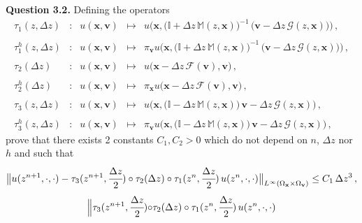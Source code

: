 \documentclass[10pt]{article}
\begin{document}
\begin{leftbar}
\textbf{Question 3.2.} Defining the operators
\begin{equation}
\begin{array}{rcccl}
\tau_{1}(z,\Delta z) & : & u(\mathbf{x},\mathbf{v}) & \longmapsto & u\Big(\mathbf{x}, \big(\mathbb{I} + \Delta z\,\mathbb{M}(z,\mathbf{x})\big)^{-1} \, \big(\mathbf{v} - \Delta z\,\bm{\mathcal{G}}(z,\mathbf{x})\big) \Big) \, , \\ \\
\tau_{1}^{h}(z,\Delta z) & : & u(\mathbf{x},\mathbf{v}) & \longmapsto & \pi_{\mathbf{v}}u\Big(\mathbf{x}, \big(\mathbb{I} + \Delta z\,\mathbb{M}(z,\mathbf{x})\big)^{-1} \, \big(\mathbf{v} - \Delta z \, \bm{\mathcal{G}}(z,\mathbf{x})\big) \Big) \, , \\ \\
\tau_{2}(\Delta z) & : & u(\mathbf{x},\mathbf{v}) & \longmapsto & u\big(\mathbf{x} - \Delta z \, \bm{\mathcal{F}}(\mathbf{v}),\mathbf{v}\big) \, , \\ \\
\tau_{2}^{h}(\Delta z) & : & u(\mathbf{x},\mathbf{v}) & \longmapsto & \pi_{\mathbf{x}}u\big(\mathbf{x} - \Delta z \, \bm{\mathcal{F}}(\mathbf{v}),\mathbf{v}\big) \, , \\ \\
\tau_{3}(z,\Delta z) & : & u(\mathbf{x},\mathbf{v}) & \longmapsto & u\Big(\mathbf{x}, \big(\mathbb{I} - \Delta z\,\mathbb{M}(z,\mathbf{x})\big) \, \mathbf{v} - \Delta z \, \bm{\mathcal{G}}(z,\mathbf{x}) \Big) \, , \\ \\
\tau_{3}^{h}(z,\Delta z) & : & u(\mathbf{x},\mathbf{v}) & \longmapsto & \pi_{\mathbf{v}}u\Big(\mathbf{x}, \big(\mathbb{I} - \Delta z\,\mathbb{M}(z,\mathbf{x})\big) \, \mathbf{v} - \Delta z \, \bm{\mathcal{G}}(z,\mathbf{x}) \Big) \, ,
\end{array}
\end{equation}
prove that there exists 2 constants $C_{1},C_{2} > 0$ which do not depend on $n$, $\Delta z$ nor $h$ and such that
\begin{equation}
\big\|u(z^{n+1},\cdot,\cdot)-\tau_{3}(z^{n+1},\cfrac{\Delta z}{2}) \circ \tau_{2}(\Delta z) \circ \tau_{1}(z^{n},\cfrac{\Delta z}{2}) \, u(z^{n},\cdot,\cdot)\big\|_{L^{\infty}(\Omega_{\mathbf{x}} \times \Omega_{\mathbf{v}})} \leq C_{1}\,\Delta z^{3} \, ,
\end{equation}
\begin{equation}
\begin{split}
\Big\|\tau_{3}(z^{n+1},\cfrac{\Delta z}{2}) \circ &\tau_{2}(\Delta z) \circ \tau_{1}(z^{n},\cfrac{\Delta z}{2}) \, u(z^{n},\cdot,\cdot) \\

\end{split}
\end{equation}
\end{leftbar}
\end{document}
